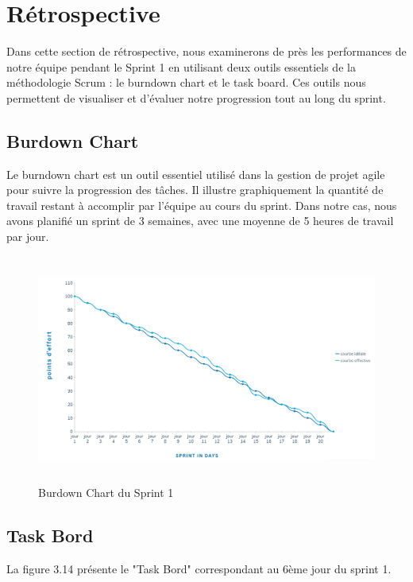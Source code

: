 

\section{Rétrospective}
Dans cette section de rétrospective, nous examinerons de près les performances de notre équipe pendant le Sprint 1 en utilisant deux outils essentiels de la méthodologie Scrum : le burndown chart et le task board. Ces outils nous permettent de visualiser et d'évaluer notre progression tout au long du sprint.


\newpage
\subsection{Burdown Chart}
Le burndown chart est un outil essentiel utilisé dans la gestion de projet agile pour suivre la progression des tâches. Il illustre graphiquement la quantité de travail restant à accomplir par l'équipe au cours du sprint. Dans notre cas, nous avons planifié un sprint de 3 semaines, avec une moyenne de 5 heures de travail par jour.

\begin{figure}[ht!]
  \centering
  \includegraphics[width=1\textwidth, height=7.5cm]{chap3.images/burndown chart sprint 1.png}
  \caption{ Burdown Chart du Sprint 1}

\end{figure}


\subsection{Task Bord}

La figure 3.14 présente le "Task Bord" correspondant au 6ème jour du sprint 1.

